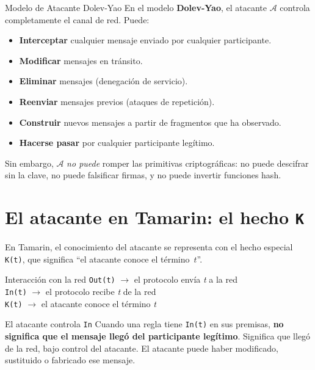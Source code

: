 \documentclass[12pt, a4paper, twoside, openright]{book}
\begin{document}
\begin{cajaDef}{Modelo de Atacante Dolev-Yao}
  En el modelo \textbf{Dolev-Yao}, el atacante $\mathcal{A}$ controla
  completamente el canal de red. Puede:
  \begin{itemize}[itemsep=2pt]
    \item \textbf{Interceptar} cualquier mensaje enviado por cualquier
      participante.
    \item \textbf{Modificar} mensajes en tr\'ansito.
    \item \textbf{Eliminar} mensajes (denegaci\'on de servicio).
    \item \textbf{Reenviar} mensajes previos (ataques de repetici\'on).
    \item \textbf{Construir} nuevos mensajes a partir de fragmentos
      que ha observado.
    \item \textbf{Hacerse pasar} por cualquier participante leg\'itimo.
  \end{itemize}
  Sin embargo, $\mathcal{A}$ \emph{no puede} romper las primitivas
  criptogr\'aficas: no puede descifrar sin la clave, no puede falsificar
  firmas, y no puede invertir funciones hash.
\end{cajaDef}

\section{El atacante en Tamarin: el hecho \texttt{K}}

En Tamarin, el conocimiento del atacante se representa con el hecho
especial \texttt{K(t)}, que significa ``el atacante conoce el
t\'ermino~$t$''.

\begin{cajaSintaxis}{Interacci\'on con la red}
  \texttt{Out(t)} $\rightarrow$ el protocolo env\'ia \textit{t} a la red\\
  \texttt{In(t)} $\rightarrow$ el protocolo recibe \textit{t} de la red\\
  \texttt{K(t)} $\rightarrow$ el atacante conoce el t\'ermino \textit{t}
\end{cajaSintaxis}

\begin{cajaAviso}{El atacante controla \texttt{In}}
  Cuando una regla tiene \texttt{In(t)} en sus premisas, \textbf{no
  significa que el mensaje lleg\'o del participante leg\'itimo}.
  Significa que lleg\'o de la red, bajo control del atacante.
  El atacante puede haber modificado, sustituido o fabricado ese mensaje.
\end{cajaAviso}
\end{document}
